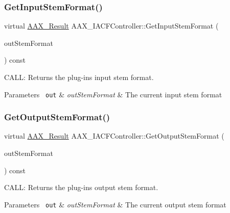 \subsubsection{\texorpdfstring{GetInputStemFormat()}{GetInputStemFormat()}}
{\footnotesize\ttfamily virtual \mbox{\hyperlink{a00392_a4d8f69a697df7f70c3a8e9b8ee130d2f}{A\+A\+X\+\_\+\+Result}} A\+A\+X\+\_\+\+I\+A\+C\+F\+Controller\+::\+Get\+Input\+Stem\+Format (\begin{DoxyParamCaption}\item[{\mbox{\hyperlink{a00491_ad8af5ef008b2bd478add9a0acb0a1d85}{A\+A\+X\+\_\+\+E\+Stem\+Format}} $\ast$}]{out\+Stem\+Format }\end{DoxyParamCaption}) const\hspace{0.3cm}{\ttfamily [pure virtual]}}



C\+A\+LL\+: Returns the plug-\/in\textquotesingle{}s input stem format. 


\begin{DoxyParams}[1]{Parameters}
\mbox{\texttt{ out}}  & {\em out\+Stem\+Format} & The current input stem format \\
\hline
\end{DoxyParams}
\mbox{\label{a01637_a7d2a011577cf27d9e79f7537aa279bcb}} 
\subsubsection{\texorpdfstring{GetOutputStemFormat()}{GetOutputStemFormat()}}
{\footnotesize\ttfamily virtual \mbox{\hyperlink{a00392_a4d8f69a697df7f70c3a8e9b8ee130d2f}{A\+A\+X\+\_\+\+Result}} A\+A\+X\+\_\+\+I\+A\+C\+F\+Controller\+::\+Get\+Output\+Stem\+Format (\begin{DoxyParamCaption}\item[{\mbox{\hyperlink{a00491_ad8af5ef008b2bd478add9a0acb0a1d85}{A\+A\+X\+\_\+\+E\+Stem\+Format}} $\ast$}]{out\+Stem\+Format }\end{DoxyParamCaption}) const\hspace{0.3cm}{\ttfamily [pure virtual]}}



C\+A\+LL\+: Returns the plug-\/in\textquotesingle{}s output stem format. 


\begin{DoxyParams}[1]{Parameters}
\mbox{\texttt{ out}}  & {\em out\+Stem\+Format} & The current output stem format \\
\hline
\end{DoxyParams}
\mbox{\label{a01637_ae4a19f971e0884aee6802ef0b3e0a020}} 
